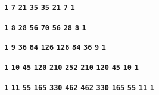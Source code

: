 \documentclass{article}
\begin{document}
\hfil
\begin{minipage}{10.000000cm}
\textbf{\texttt{\Large 1}} \hfil \textbf{\texttt{\Large 7}} \hfil \textbf{\texttt{\Large 21}} \hfil \textbf{\texttt{\Large 35}} \hfil \textbf{\texttt{\Large 35}} \hfil \textbf{\texttt{\Large 21}} \hfil \textbf{\texttt{\Large 7}} \hfil \textbf{\texttt{\Large 1}}
\end{minipage} 
\hfil
\par
\vfil



\hfil
\begin{minipage}{11.250000cm}
\textbf{\texttt{\Large 1}} \hfil \textbf{\texttt{\Large 8}} \hfil \textbf{\texttt{\Large 28}} \hfil \textbf{\texttt{\Large 56}} \hfil \textbf{\texttt{\Large 70}} \hfil \textbf{\texttt{\Large 56}} \hfil \textbf{\texttt{\Large 28}} \hfil \textbf{\texttt{\Large 8}} \hfil \textbf{\texttt{\Large 1}}
\end{minipage} 
\hfil
\par
\vfil



\hfil
\begin{minipage}{12.500000cm}
\textbf{\texttt{\Large 1}} \hfil \textbf{\texttt{\Large 9}} \hfil \textbf{\texttt{\Large 36}} \hfil \textbf{\texttt{\Large 84}} \hfil \textbf{\texttt{\Large 126}} \hfil \textbf{\texttt{\Large 126}} \hfil \textbf{\texttt{\Large 84}} \hfil \textbf{\texttt{\Large 36}} \hfil \textbf{\texttt{\Large 9}} \hfil \textbf{\texttt{\Large 1}}
\end{minipage} 
\hfil
\par
\vfil



\hfil
\begin{minipage}{13.750000cm}
\textbf{\texttt{\Large 1}} \hfil \textbf{\texttt{\Large 10}} \hfil \textbf{\texttt{\Large 45}} \hfil \textbf{\texttt{\Large 120}} \hfil \textbf{\texttt{\Large 210}} \hfil \textbf{\texttt{\Large 252}} \hfil \textbf{\texttt{\Large 210}} \hfil \textbf{\texttt{\Large 120}} \hfil \textbf{\texttt{\Large 45}} \hfil \textbf{\texttt{\Large 10}} \hfil \textbf{\texttt{\Large 1}}
\end{minipage} 
\hfil
\par
\vfil



\hfil
\begin{minipage}{15.000000cm}
\textbf{\texttt{\Large 1}} \hfil \textbf{\texttt{\Large 11}} \hfil \textbf{\texttt{\Large 55}} \hfil \textbf{\texttt{\Large 165}} \hfil \textbf{\texttt{\Large 330}} \hfil \textbf{\texttt{\Large 462}} \hfil \textbf{\texttt{\Large 462}} \hfil \textbf{\texttt{\Large 330}} \hfil \textbf{\texttt{\Large 165}} \hfil \textbf{\texttt{\Large 55}} \hfil \textbf{\texttt{\Large 11}} \hfil \textbf{\texttt{\Large 1}}
\end{minipage} 
\hfil
\par
\vfil
\end{document}
